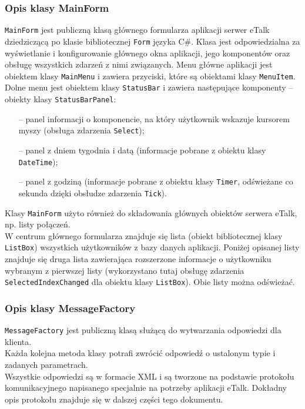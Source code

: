\documentclass[a4paper,12pt]{article}
\begin{document}
\subsubsection[Opis klasy MainForm]{Opis klasy MainForm}
\texttt{MainForm} jest publiczną klasą głównego formularza aplikacji serwer eTalk dziedziczącą po klasie bibliotecznej \texttt{Form} języka C\#. Klasa jest odpowiedzialna za wyświetlanie i konfigurowanie głównego
okna aplikacji, jego komponentów oraz obsługę wszystkich zdarzeń z nimi związanych.
Menu główne aplikacji jest obiektem klasy \texttt{MainMenu} i zawiera przyciski, które są obiektami
klasy \texttt{MenuItem}. Dolne menu jest obiektem klasy \texttt{StatusBar} i zawiera następujące komponenty -- obiekty
klasy \texttt{StatusBarPanel}:
\begin{itemize}
    \item[--] panel informacji o komponencie, na który użytkownik wskazuje kursorem myszy
(obsługa zdarzenia \texttt{Select});
    \item[--] panel z dniem tygodnia i datą (informacje pobrane z obiektu klasy \texttt{DateTime});
    \item[--] panel z godziną (informacje pobrane z obiektu klasy \texttt{Timer}, odświeżane co sekunda
dzięki obsłudze zdarzenia \texttt{Tick}).
\end{itemize}
Klasy \texttt{MainForm} użyto również do składowania głównych obiektów serwera eTalk,
np. listy połączeń.\\
W centrum głównego formularza znajduje się lista (obiekt bibliotecznej klasy \texttt{ListBox}) wszystkich użytkowników z bazy danych aplikacji.
Poniżej opisanej listy znajduje się druga lista zawierająca rozszerzone informacje o użytkowniku wybranym z pierwszej listy (wykorzystano tutaj obsługę zdarzenia \texttt{SelectedIndexChanged} dla obiektu klasy \texttt{ListBox}). Obie listy można odświeżać.

\subsubsection[Opis klasy MessageFactory]{Opis klasy MessageFactory}
\texttt{MessageFactory} jest publiczną klasą służącą do wytwarzania odpowiedzi dla klienta.\\
Każda kolejna metoda klasy potrafi zwrócić odpowiedź o ustalonym typie i zadanych parametrach.\\
Wszystkie odpowiedzi są w formacie XML i są tworzone na podstawie protokołu komunikacyjnego napisanego specjalnie na potrzeby aplikacji eTalk. Dokładny opis protokołu znajduje się w dalszej części tego dokumentu.
\end{document}
